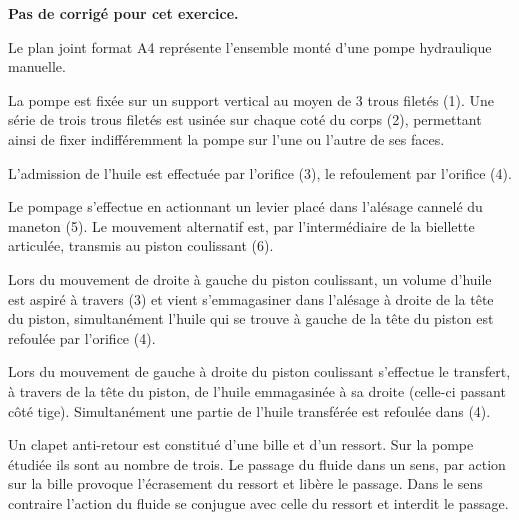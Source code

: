 \normalfalse \difficiletrue \tdifficilefalse
\correctionfalse

\setcounter{numques}{0}

\ifcorrection
\else
\textbf{Pas de corrigé pour cet exercice.}
\fi


\ifprof
\else
Le plan joint format A4 représente l’ensemble monté d’une pompe hydraulique manuelle.

La pompe est fixée sur un support vertical au moyen de 3 trous filetés (1). Une série de trois trous filetés est usinée sur chaque coté du corps (2), permettant ainsi de fixer indifféremment la pompe sur l’une ou l’autre de ses faces.

L’admission de l’huile est effectuée par l’orifice (3), le refoulement par l’orifice (4).

Le pompage s’effectue en actionnant un levier placé dans l’alésage cannelé du maneton (5). Le mouvement alternatif est, par l’intermédiaire de la biellette articulée, transmis au piston coulissant (6).

Lors du mouvement de droite à gauche du piston coulissant, un volume d’huile est aspiré à travers (3) et vient s’emmagasiner dans l’alésage à droite de la tête du piston, simultanément l’huile qui se trouve à gauche de la tête du piston est refoulée par l’orifice (4).

Lors du mouvement de gauche à droite du piston coulissant s’effectue le transfert, à travers de la tête du piston, de l’huile emmagasinée à sa droite (celle-ci passant côté tige). Simultanément une partie de l’huile transférée est refoulée dans (4).

Un clapet anti-retour est constitué d’une bille et d’un ressort. Sur la pompe étudiée ils sont au nombre de trois. 
Le passage du fluide dans un sens, par action sur la bille provoque l’écrasement du ressort et libère le passage. 
Dans le sens contraire l’action du fluide se conjugue avec celle du ressort et interdit le passage. 
\fi


